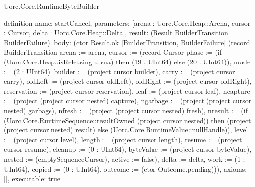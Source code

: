 \begin{lexlean}{Uorc.Core.RuntimeByteBuilder}
\begin{semanticmodule}
definition{
  name: startCancel,
  parameters: [arena : Uorc.Core.Heap::Arena, cursor : Cursor, delta : Uorc.Core.Heap::Delta],
  result: (Result BuilderTransition BuilderFailure),
  body: (ctor Result.ok [BuilderTransition, BuilderFailure] (record BuilderTransition {arena := arena, cursor := (record Cursor {phase := (if (Uorc.Core.Heap::isReleasing arena) then (19 : UInt64) else (20 : UInt64)), mode := (2 : UInt64), builder := (project cursor builder), carry := (project cursor carry), oldLeft := (project cursor oldLeft), oldRight := (project cursor oldRight), reservation := (project cursor reservation), leaf := (project cursor leaf), ncapture := (project (project cursor nested) capture), ngarbage := (project (project cursor nested) garbage), nfresh := (project (project cursor nested) fresh), nresult := (if (Uorc.Core.RuntimeSequence::resultOwned (project cursor nested)) then (project (project cursor nested) result) else (Uorc.Core.RuntimeValue::nullHandle)), level := (project cursor level), length := (project cursor length), resume := (project cursor resume), cleanup := (0 : UInt64), byteValue := (project cursor byteValue), nested := (emptySequenceCursor), active := false}), delta := delta, work := (1 : UInt64), copied := (0 : UInt64), outcome := (ctor Outcome.pending)})),
  axioms: [],
  executable: true
}


\end{semanticmodule}
\end{lexlean}
